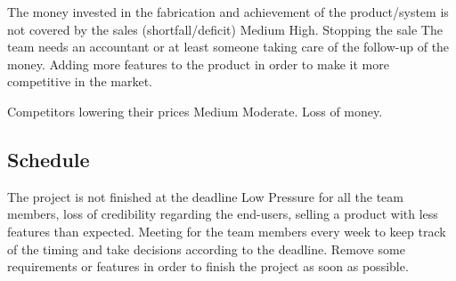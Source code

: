 {The money invested in the fabrication and achievement of the product/system is not covered by the sales (shortfall/deficit)}
{Medium}
{High. Stopping the sale}
{The team needs an accountant or at least someone taking care of the follow-up of the money.}
{Adding more features to the product in order to make it more competitive in the market.}

{Competitors lowering their prices}
{Medium}
{Moderate. Loss of money.}
{  }
{  }
	
	


\subsection{Schedule}
{The project is not finished at the deadline}
{Low}
{Pressure for all the team members, loss of credibility regarding the end-users, selling a product with less features than expected.}
{ Meeting for the team members every week to keep track of the timing and take decisions according to the deadline. }
{ Remove some requirements or features in order to finish the project as soon as possible. }